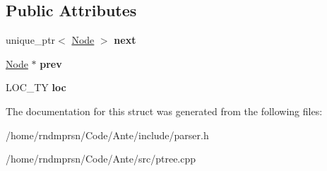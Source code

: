 \subsection*{Public Attributes}
\begin{DoxyCompactItemize}
\item 
\mbox{\label{structNode_a018e5154229ceeaba9f76f42588585fd}} 
unique\+\_\+ptr$<$ \hyperlink{structNode}{Node} $>$ {\bfseries next}
\item 
\mbox{\label{structNode_a632ea91c6a13082308f7692649a68880}} 
\hyperlink{structNode}{Node} $\ast$ {\bfseries prev}
\item 
\mbox{\label{structNode_a87efd1bb0a94659ad56b0ea36d0de6b1}} 
L\+O\+C\+\_\+\+TY {\bfseries loc}
\end{DoxyCompactItemize}


The documentation for this struct was generated from the following files\+:\begin{DoxyCompactItemize}
\item 
/home/rndmprsn/\+Code/\+Ante/include/parser.\+h\item 
/home/rndmprsn/\+Code/\+Ante/src/ptree.\+cpp\end{DoxyCompactItemize}
